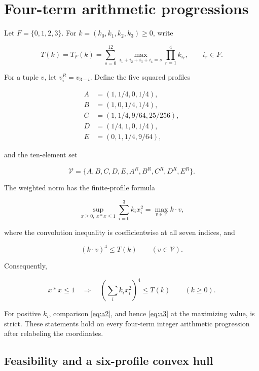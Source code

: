 \section{Four-term arithmetic progressions}
\label{sec:ap4}
Let \(F=\{0,1,2,3\}\). For \(k=(k_0,k_1,k_2,k_3)\ge0\), write

\[
T(k)=T_F(k)=\sum_{s=0}^{12}
\max_{i_1+i_2+i_3+i_4=s}\prod_{r=1}^{4}k_{i_r},
\qquad i_r\in F.
\]

For a tuple \(v\), let \(v^R_i=v_{3-i}\). Define the five squared profiles

\[
\begin{aligned}
A&=(1,1/4,0,1/4),\\
B&=(1,0,1/4,1/4),\\
C&=(1,1/4,9/64,25/256),\\
D&=(1/4,1,0,1/4),\\
E&=(0,1,1/4,9/64),
\end{aligned}
\]

and the ten-element set

\[
\mathcal V=\{A,B,C,D,E,A^R,B^R,C^R,D^R,E^R\}.
\]

\begin{proposition}\label{prop:ap4}
The weighted norm has the finite-profile formula

\begin{equation}\label{eq:a1}
\boxed{\quad
\sup_{x\ge0,\;x*x\le1}\sum_{i=0}^{3}k_ix_i^2
=\max_{v\in\mathcal V}k\cdot v,
\quad}
\end{equation}

where the convolution inequality is coefficientwise at all seven indices, and

\begin{equation}\label{eq:a2}
\boxed{\quad
(k\cdot v)^4\le T(k)\qquad(v\in\mathcal V).
\quad}
\end{equation}

Consequently,

\begin{equation}\label{eq:a3}
x*x\le1\quad\Longrightarrow\quad
\left(\sum_i k_ix_i^2\right)^4\le T(k)
\qquad(k\ge0).
\end{equation}

For positive \(k_i\), comparison \eqref{eq:a2}, and hence \eqref{eq:a3} at the maximizing value,
is strict. These statements hold on every four-term integer arithmetic
progression after relabeling the coordinates.
\end{proposition}

\subsection{Feasibility and a six-profile convex hull}

